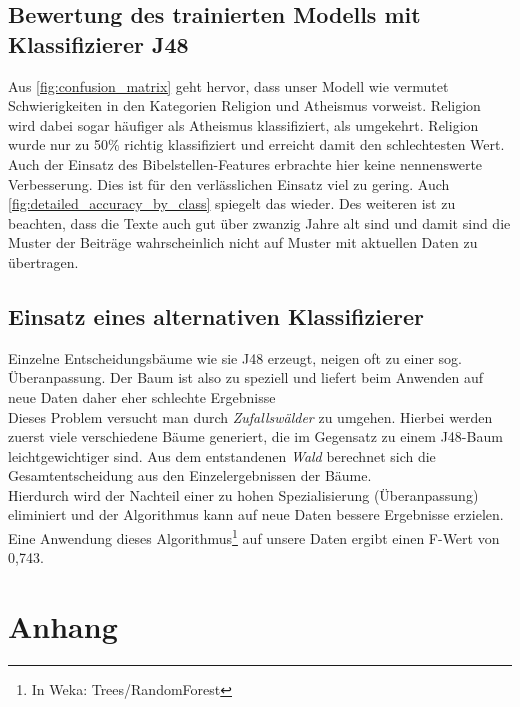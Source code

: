 \documentclass[
	11pt,
	a4paper
]{scrartcl}
\begin{document}
\subsection{Bewertung des trainierten Modells mit Klassifizierer J48}
Aus \autoref{fig:confusion_matrix} geht hervor, dass unser Modell wie vermutet Schwierigkeiten in den Kategorien Religion und Atheismus vorweist. 
Religion wird dabei sogar häufiger als Atheismus klassifiziert, als umgekehrt. 
Religion wurde nur zu 50\% richtig klassifiziert und erreicht damit den schlechtesten Wert. 
Auch der Einsatz des Bibelstellen-Features erbrachte hier keine nennenswerte
Verbesserung.
Dies ist für den verlässlichen Einsatz viel zu gering.
Auch \autoref{fig:detailed_accuracy_by_class} spiegelt das wieder.
Des weiteren ist zu beachten, dass die Texte auch gut über zwanzig Jahre alt sind und damit sind die Muster der Beiträge wahrscheinlich nicht
auf Muster mit aktuellen Daten zu übertragen.

\subsection{Einsatz eines alternativen Klassifizierer}
Einzelne Entscheidungsbäume wie sie J48 erzeugt, neigen oft zu einer sog. Überanpassung. Der Baum ist also zu speziell und liefert beim
Anwenden auf neue Daten daher eher schlechte Ergebnisse\\

Dieses Problem versucht man durch \emph{Zufallswälder} zu umgehen. Hierbei werden zuerst viele verschiedene Bäume generiert, die im
Gegensatz zu einem J48-Baum leichtgewichtiger sind. Aus dem entstandenen \emph{Wald} berechnet sich die Gesamtentscheidung aus den
Einzelergebnissen der Bäume.\\
Hierdurch wird der Nachteil einer zu hohen Spezialisierung (Überanpassung) eliminiert und der
Algorithmus kann auf neue Daten bessere Ergebnisse erzielen.\\

Eine Anwendung dieses Algorithmus\footnote{In Weka: Trees/RandomForest} auf unsere Daten ergibt einen F-Wert von 0,743.

\newpage
\section{Anhang}
\end{document}

